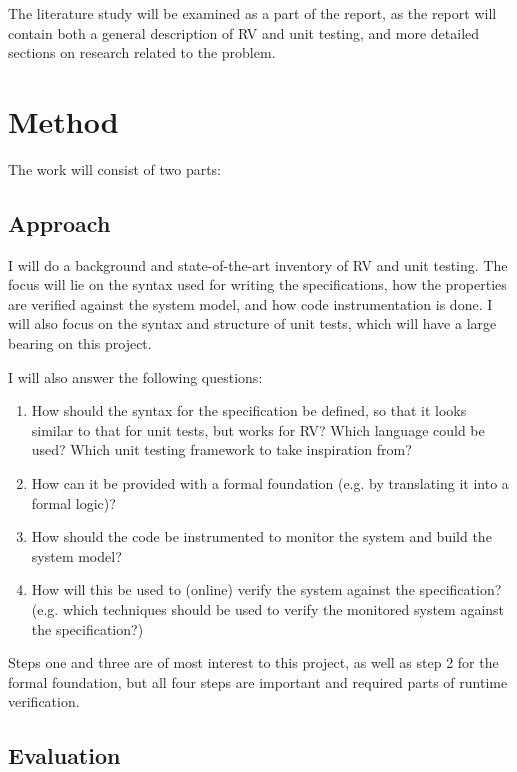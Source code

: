 \documentclass[a4paper,11pt]{article}
\begin{document}
The literature study will be examined as a part of the report, as the report will contain
both a general description of RV and unit testing, and more detailed sections on research related to the problem.


\section{Method}

The work will consist of two parts:


\subsection{Approach}

I will do a background and state-of-the-art inventory of RV and unit testing.
The focus will lie on the syntax used for writing the specifications, how the
properties are verified against the system model, and how code instrumentation
is done. I will also focus on the syntax and structure of unit tests, which will have a large bearing on this project.

I will also answer the following questions:

\begin{enumerate}
	\item How should the syntax for the specification be defined,
		so that it looks similar to that for unit tests, but works for RV?
		Which language could be used? Which unit testing framework to take inspiration from?
    \item How can it be provided with a formal foundation (e.g. by translating
        it into a formal logic)?
	\item How should the code be instrumented to monitor the system and build the system model?
	\item How will this be used to (online) verify the system against the
        specification? (e.g. which techniques should be used to verify the
        monitored system against the specification?)
\end{enumerate}

Steps one and three are of most interest to this project, as well as step 2 for the formal foundation, but all four steps are important and required parts of runtime verification.


\subsection{Evaluation}
\end{document}
